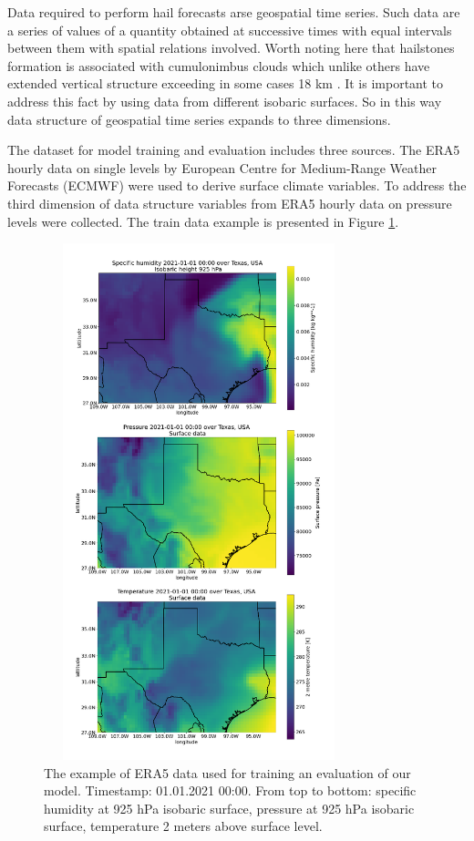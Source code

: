 \documentclass[conference]{IEEEtran}
\begin{document}
Data required to perform hail forecasts arse geospatial time series. Such data are a series of values of a quantity obtained at successive times with equal intervals between them with spatial relations involved. Worth noting here that hailstones formation is associated with cumulonimbus clouds which unlike others have extended vertical structure exceeding in some cases 18 km \cite{Krauss2007}. It is important to address this fact by using data from different isobaric surfaces. So in this way data structure of geospatial time series expands to three dimensions. 

The dataset for model training and evaluation includes three sources. The ERA5 hourly data on single levels by European Centre for Medium-Range Weather Forecasts (ECMWF) were used to derive surface climate variables. To address the third dimension of data structure variables from ERA5 hourly data on pressure levels were collected. The train data example is presented in Figure \ref{fig: 3pics}.

\begin{figure}[htbp]
\centerline{\includegraphics[width=9cm,height=15cm,keepaspectratio]{3pics.png}}
\caption{The example of ERA5 data used for training an evaluation of our model. Timestamp: 01.01.2021 00:00. From top to bottom: specific humidity at 925 hPa isobaric surface, pressure at 925 hPa isobaric surface, temperature 2 meters above surface level.}
\label{fig: 3pics}
\end{figure}
\end{document}
